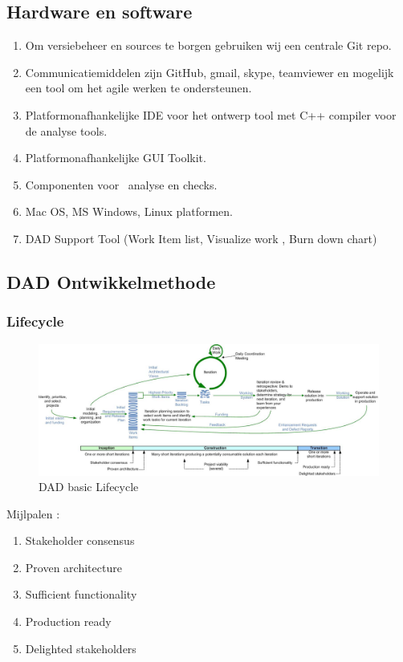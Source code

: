 \subsection{Hardware en software}
\begin{enumerate}
	\item Om versiebeheer en sources te borgen gebruiken wij een centrale Git repo.
	\item Communicatiemiddelen zijn GitHub, gmail, skype,  teamviewer en mogelijk een tool om
		het agile werken te ondersteunen.
	\item Platformonafhankelijke IDE voor het ontwerp tool met C++ compiler voor de analyse tools.
	\item Platformonafhankelijke GUI Toolkit.
	\item Componenten voor \xmas\ analyse en checks.
	\item Mac OS,  MS Windows, Linux platformen.
	\item DAD Support Tool (Work Item list, Visualize work , Burn down chart)
\end{enumerate}


\subsection{DAD Ontwikkelmethode}
\subsubsection{Lifecycle}

\begin{figure}
  \includegraphics[width=\textwidth]{dadLifecycleUP2}
  \caption{DAD basic Lifecycle}
\end{figure}
Mijlpalen :
\begin{enumerate}
\item Stakeholder consensus
\item Proven architecture
\item Sufficient functionality
\item Production ready
\item Delighted stakeholders
\end{enumerate}

